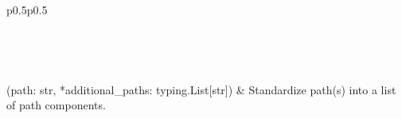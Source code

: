 \documentclass[letterpaper,10pt,english]{sphinxmanual}
\begin{document}
\begin{savenotes}\sphinxatlongtablestart\begin{longtable}[c]{p{0.5\linewidth}p{0.5\linewidth}}
\hline

\endfirsthead

%
{}\\
\hline

\endhead

\hline
{}\\
\endfoot

\endlastfoot

{\hyperref[\detokenize{autoapi/pine/client/client/index:pine.client.client._standardize_path}]{}}(path: str, *additional\_paths: typing.List{[}str{]})
&
Standardize path(s) into a list of path components.
\\
\hline
\end{longtable}\sphinxatlongtableend\end{savenotes}
\end{document}
